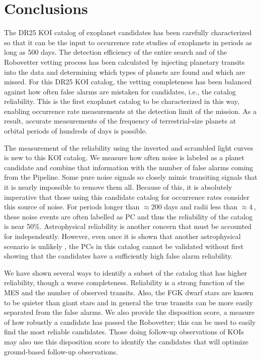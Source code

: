 

\section{Conclusions}
\label{s:conclusions}

The DR25 KOI catalog of exoplanet candidates has been carefully characterized so that it can be the input to occurrence rate studies of exoplanets in periods as long as 500 days. The detection efficiency of the entire search \citep{Burke2017b,Christiansen2017} and of the Robovetter vetting process \citep{Coughlin2017a} has been calculated by injecting planetary transits into the data and determining which types of planets are found and which are missed. For this DR25 KOI catalog, the vetting completeness has been balanced against how often false alarms are mistaken for candidates, i.e., the catalog reliability. This is the first \Kepler{} exoplanet catalog to be characterized in this way, enabling occurrence rate measurements at the detection limit of the mission.  As a result, accurate measurements of the frequency of terrestrial-size planets at orbital periods of hundreds of days is possible.

The measurement of the reliability using the inverted and scrambled light curves is new to this KOI catalog. We measure how often noise is labeled as a planet candidate and combine that information with the number of false alarms coming from the \Kepler{} Pipeline. Some pure noise signals so closely mimic transiting signals that it is nearly impossible to remove them all. Because of this, it is absolutely imperative that those using this candidate catalog for occurrence rates consider this source of noise. For periods longer than $\approx$200 days and radii less than $\approx$4\,\Rearth, these noise events are often labelled as PC and thus the reliability of the catalog is near 50\%.  Astrophysical reliability is another concern that must be accounted for independently.  However, even once it is shown that another astrophysical scenario is unlikely \citep[as was done for the DR24 KOIs in][]{Morton2017}, the PCs in this catalog cannot be validated without first showing that the candidates have a sufficiently high false alarm reliability. 

We have shown several ways to identify a subset of the catalog that has higher reliability, though a worse completeness. Reliability is a strong function of the MES and the number of observed transits. Also, the FGK dwarf stars are known to be quieter than giant stars and in general the true transits can be more easily separated from the false alarms. We also provide the disposition score, a measure of how robustly a candidate has passed the Robovetter; this can be used to easily find the most reliable candidates. Those doing follow-up observations of KOIs may also use this disposition score to identify the candidates that will optimize ground-based follow-up observations.  



